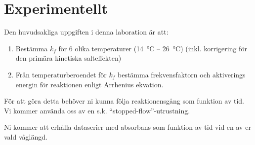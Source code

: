 \section{Experimentellt}
\label{sec:exper}
Den huvudsakliga uppgiften i denna laboration är att:
\begin{enumerate}
\item Bestämma $k_f$ för 6 olika temperaturer (\SI{14}{\degreeCelsius} --
  \SI{26}{\degreeCelsius}) (inkl. korrigering för den primära kinetiska
  salteffekten) 
\item Från temperaturberoendet för $k_f$ bestämma frekvensfaktorn och
  aktiverings energin för reaktionen enligt Arrhenius ekvation.
\end{enumerate}

För att göra detta behöver ni kunna följa reaktionensgång som funktion av
tid. Vi kommer använda oss av en s.k. ``stopped-flow''-utrustning.


Ni kommer att erhålla dataserier med absorbans som funktion av tid vid en
av er vald våglängd.

